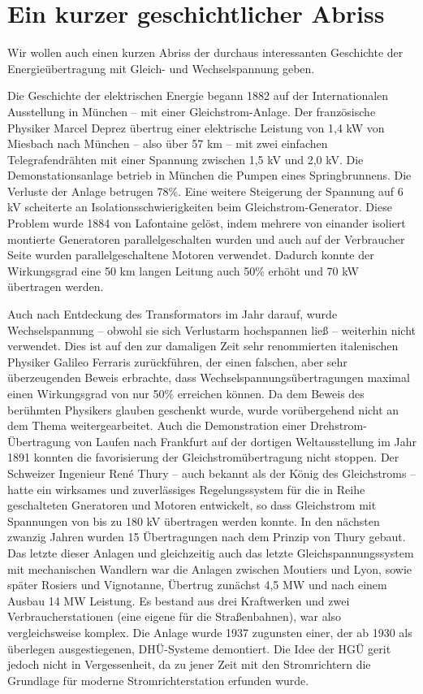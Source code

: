 
\section{Ein kurzer geschichtlicher Abriss}
Wir wollen auch einen kurzen Abriss der durchaus interessanten Geschichte der Energieübertragung mit Gleich- und Wechselspannung geben.

Die Geschichte der elektrischen Energie begann 1882 auf der Internationalen Ausstellung in München – mit einer Gleichstrom-Anlage. Der französische Physiker Marcel Deprez übertrug einer elektrische Leistung von 1,4 kW von Miesbach nach München – also über 57 km – mit zwei einfachen Telegrafendrähten mit einer Spannung zwischen 1,5 kV und 2,0 kV. Die Demonstationsanlage betrieb in München die Pumpen eines Springbrunnens. Die Verluste der Anlage betrugen 78\%. Eine weitere Steigerung der Spannung auf 6 kV scheiterte an Isolationsschwierigkeiten beim Gleichstrom-Generator. Diese Problem wurde 1884 von Lafontaine gelöst, indem mehrere von einander isoliert montierte Generatoren parallelgeschalten wurden und auch auf der Verbraucher Seite wurden parallelgeschaltene Motoren verwendet. Dadurch konnte der Wirkungsgrad eine 50 km langen Leitung auch 50\% erhöht und 70 kW übertragen werden.\cite{Schymroch}

Auch nach Entdeckung des Transformators im Jahr darauf, wurde Wechselspannung -- obwohl sie sich Verlustarm hochspannen ließ -- weiterhin nicht verwendet.
Dies ist auf den zur damaligen Zeit sehr renommierten italenischen Physiker Galileo Ferraris zurückführen,
der einen falschen, aber sehr überzeugenden Beweis erbrachte, dass Wechselspannungsübertragungen maximal einen Wirkungsgrad von nur 50\% erreichen können.
Da dem Beweis des berühmten Physikers glauben geschenkt wurde, wurde vorübergehend nicht an dem Thema weitergearbeitet.
Auch die Demonstration einer Drehstrom-Übertragung von Laufen nach Frankfurt auf der dortigen Weltausstellung im Jahr 1891 konnten die favorisierung der Gleichstromübertragung nicht stoppen.
Der Schweizer Ingenieur René Thury -- auch bekannt als der König des Gleichstroms -- hatte ein wirksames und zuverlässiges Regelungssystem für die in Reihe geschalteten Gneratoren und Motoren entwickelt, so dass Gleichstrom mit Spannungen von bis zu 180 kV übertragen werden konnte. In den nächsten zwanzig Jahren wurden 15 Übertragungen nach dem Prinzip von Thury gebaut. Das letzte dieser Anlagen und gleichzeitig auch das letzte Gleichspannungssystem mit mechanischen Wandlern war die Anlagen zwischen Moutiers und Lyon, sowie später Rosiers und Vignotanne, Übertrug zunächst 4,5 MW und nach einem Ausbau 14 MW Leistung. Es bestand aus drei Kraftwerken und zwei Verbraucherstationen (eine eigene für die Straßenbahnen), war also vergleichsweise komplex. Die Anlage wurde 1937 zugunsten einer, der ab 1930 als überlegen ausgestiegenen, DHÜ-Systeme demontiert. Die Idee der HGÜ gerit jedoch nicht in Vergessenheit, da zu jener Zeit mit den Stromrichtern die Grundlage für moderne Stromrichterstation erfunden wurde.\cite{Schymroch}


